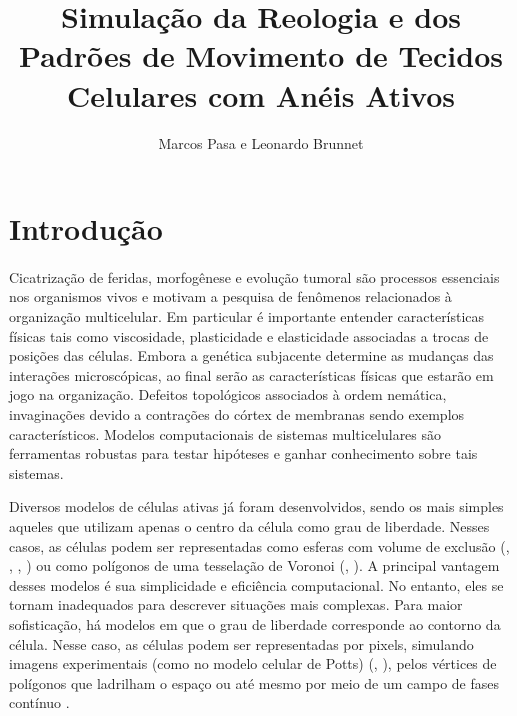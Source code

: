 \documentclass{article}
\title{Simulação da Reologia e dos Padrões de Movimento de Tecidos Celulares com Anéis Ativos}
\author{Marcos Pasa e Leonardo Brunnet}
\theoremstyle{definition}
\begin{document}
\maketitle

\section{Introdução}
\paragraph{}
Cicatrização de feridas, morfogênese e evolução tumoral são processos essenciais nos organismos vivos e motivam a pesquisa de fenômenos relacionados à organização multicelular. Em particular é importante entender características físicas tais como viscosidade, plasticidade e elasticidade associadas a trocas de posições das células. Embora a genética subjacente determine as mudanças das interações microscópicas, ao final serão as características físicas que estarão em jogo na organização. Defeitos topológicos associados à ordem nemática, invaginações devido a contrações do córtex de membranas sendo  exemplos característicos. Modelos computacionais de sistemas multicelulares são ferramentas robustas para testar hipóteses e ganhar conhecimento sobre tais sistemas.

Diversos modelos de células ativas já foram desenvolvidos, sendo os mais simples aqueles que utilizam apenas o centro da célula como grau de liberdade. Nesses casos, as células podem ser representadas como esferas com volume de exclusão (\cite{vicsek_novel_1995}, \cite{gregoire_moving_2003}, \cite{szabo_phase_2006}, \cite{belmonte_self-propelled_2008}) ou como polígonos de uma tesselação de Voronoi (\cite{barton_active_2017}, \cite{bi_motility-driven_2016}). A principal vantagem desses modelos é sua simplicidade e eficiência computacional. No entanto, eles se tornam inadequados para descrever situações mais complexas. Para maior sofisticação, há modelos em que o grau de liberdade corresponde ao contorno da célula. Nesse caso, as células podem ser representadas por pixels, simulando imagens experimentais (como no modelo celular de Potts) (\cite{kabla_collective_2012}, \cite{kafer_moving_2006}), pelos vértices de polígonos que ladrilham o espaço \cite{perez-verdugo_vertex_2020} ou até mesmo por meio de um campo de fases contínuo \cite{loewe_solid-liquid_2020}.
\end{document}
